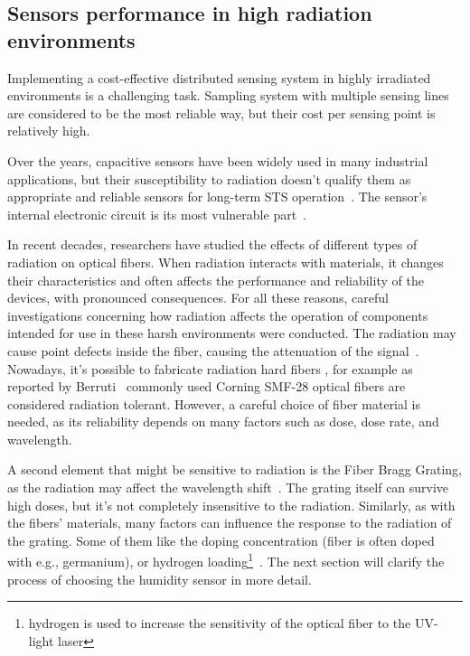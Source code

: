 \subsection{Sensors performance in high radiation environments}
\label{fos_irrad}
Implementing a cost-effective distributed sensing system in highly irradiated environments is a challenging task. Sampling system with multiple sensing lines are considered to be the most reliable way, but their cost per sensing point is relatively high. 

Over the years, capacitive sensors have been widely used in many industrial applications, but their susceptibility to radiation doesn't qualify them as appropriate and reliable sensors for long-term \gls{STS} operation~\cite{Kapic, capacitive_irrad, Berruti}. The sensor's internal electronic circuit is its most vulnerable part~\cite{SHCHEMEROV20222871}.

In recent decades, researchers have studied the effects of different types of radiation on optical fibers. When radiation interacts with materials, it changes their characteristics and often affects the performance and reliability of the devices, with pronounced consequences. For all these reasons, careful investigations concerning how radiation affects the operation of components intended for use in these harsh environments were conducted. The radiation may cause point defects inside the fiber, causing the attenuation of the signal~\cite{FOS_FIB_RAD}. Nowadays, it's possible to fabricate radiation hard fibers \cite{troska}, for example as reported by Berruti~\cite{Berruti} commonly used Corning SMF-28 optical fibers are considered radiation tolerant. However, a careful choice of fiber material is needed, as its reliability depends on many factors such as dose, dose rate, and wavelength.  

A second element that might be sensitive to radiation is the  Fiber Bragg Grating, as the radiation may affect the wavelength shift~\cite{gusarov}. The grating itself can survive high doses, but it's not completely insensitive to the radiation. Similarly, as with the fibers' materials, many factors can influence the response to the radiation of the grating. Some of them like the doping concentration (fiber is often doped with e.g., germanium), or hydrogen loading\footnote{hydrogen is used to increase the sensitivity of the optical fiber to the UV-light laser}~\cite{gusarov}. The next section will clarify the process of choosing the humidity sensor in more detail. 


